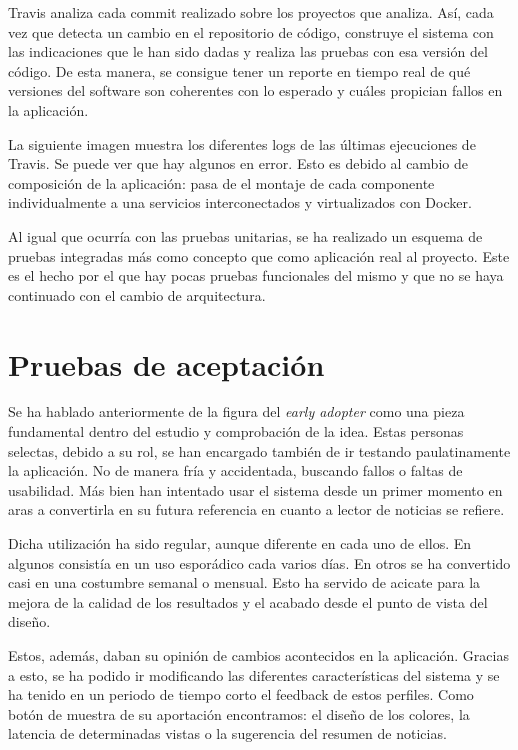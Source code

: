 Travis analiza cada commit realizado sobre los proyectos que analiza. Así, cada vez que detecta un cambio en el repositorio de código, construye el sistema con las indicaciones que le han sido dadas y realiza las pruebas con esa versión del código. De esta manera, se consigue tener un reporte en tiempo real de qué versiones del software son coherentes con lo esperado y cuáles propician fallos en la aplicación.

La siguiente imagen muestra los diferentes logs de las últimas ejecuciones de Travis. Se puede ver que hay algunos en error. Esto es debido al cambio de composición de la aplicación: pasa de el montaje de cada componente individualmente a una servicios interconectados y virtualizados con Docker.


Al igual que ocurría con las pruebas unitarias, se ha realizado un esquema de pruebas integradas más como concepto que como aplicación real al proyecto. Este es el hecho por el que hay pocas pruebas funcionales del mismo y que no se haya continuado con el cambio de arquitectura.

\section{Pruebas de aceptación}\label{sec:pruebas_aceptacion}

Se ha hablado anteriormente de la figura del \textit{early adopter} como una pieza fundamental dentro del estudio y comprobación de la idea. Estas personas selectas, debido a su rol, se han encargado también de ir testando paulatinamente la aplicación. No de manera fría y accidentada, buscando fallos o faltas de usabilidad. Más bien han intentado usar el sistema desde un primer momento en aras a convertirla en su futura referencia en cuanto a lector de noticias se refiere.

Dicha utilización ha sido regular, aunque diferente en cada uno de ellos. En algunos consistía en un uso esporádico cada varios días. En otros se ha convertido casi en una costumbre semanal o mensual. Esto ha servido de acicate para la mejora de la calidad de los resultados y el acabado desde el punto de vista del diseño.

Estos, además, daban su opinión de cambios acontecidos en la aplicación. Gracias a esto, se ha podido ir modificando las diferentes características del sistema y se ha tenido en un periodo de tiempo corto el feedback de estos perfiles. Como botón de muestra de su aportación encontramos: el diseño de los colores, la latencia de determinadas vistas o la sugerencia del resumen de noticias.

